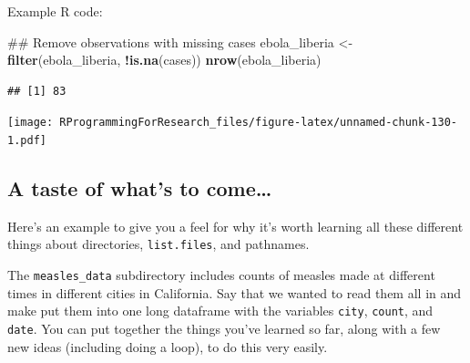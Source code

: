 \documentclass[]{book}
\makeatletter
\newenvironment{Shaded}{\begin{snugshade}}{\end{snugshade}}
\newcommand{\KeywordTok}[1]{\textcolor[rgb]{0.13,0.29,0.53}{\textbf{#1}}}
\newcommand{\DataTypeTok}[1]{\textcolor[rgb]{0.13,0.29,0.53}{#1}}
\newcommand{\StringTok}[1]{\textcolor[rgb]{0.31,0.60,0.02}{#1}}
\newcommand{\OperatorTok}[1]{\textcolor[rgb]{0.81,0.36,0.00}{\textbf{#1}}}
\newcommand{\NormalTok}[1]{#1}
\newenvironment{kframe}{%
\medskip{}
\setlength{\fboxsep}{.8em}
 \def\at@end@of@kframe{}%
 \ifinner\ifhmode%
  \def\at@end@of@kframe{\end{minipage}}%
  \begin{minipage}{\columnwidth}%
 \fi\fi%
 \def\FrameCommand##1{\hskip\@totalleftmargin \hskip-\fboxsep
 \colorbox{shadecolor}{##1}\hskip-\fboxsep
     \hskip-\linewidth \hskip-\@totalleftmargin \hskip\columnwidth}%
 \MakeFramed {\advance\hsize-\width
   \@totalleftmargin\z@ \linewidth\hsize
   \@setminipage}}%
 {\par\unskip\endMakeFramed%
 \at@end@of@kframe}
\renewenvironment{Shaded}{\begin{kframe}}{\end{kframe}}
\theoremstyle{definition}
\theoremstyle{definition}
\theoremstyle{definition}
\theoremstyle{remark}
\makeatother
\begin{document}
Example R code:

\begin{Shaded}
\begin{Highlighting}[]
\NormalTok{## Remove observations with missing cases}
\NormalTok{ebola_liberia <-}\StringTok{ }\KeywordTok{filter}\NormalTok{(ebola_liberia, }\OperatorTok{!}\KeywordTok{is.na}\NormalTok{(cases))}
\KeywordTok{nrow}\NormalTok{(ebola_liberia)}
\end{Highlighting}
\end{Shaded}

\begin{verbatim}
## [1] 83
\end{verbatim}

\begin{Shaded}
\end{Shaded}

\texttt{[image: RProgrammingForResearch\_files/figure-latex/unnamed-chunk-130-1.pdf]}

\subsection{A taste of what's to
come\ldots{}}\label{a-taste-of-whats-to-come}

Here's an example to give you a feel for why it's worth learning all
these different things about directories, \texttt{list.files}, and
pathnames.

The \texttt{measles\_data} subdirectory includes counts of measles made
at different times in different cities in California. Say that we wanted
to read them all in and make put them into one long dataframe with the
variables \texttt{city}, \texttt{count}, and \texttt{date}. You can put
together the things you've learned so far, along with a few new ideas
(including doing a loop), to do this very easily.
\end{document}
